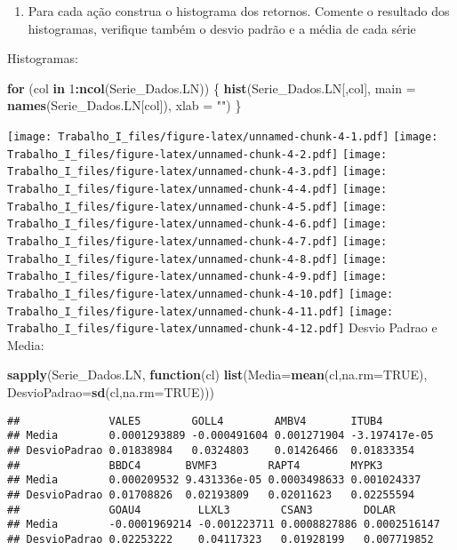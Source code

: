 \documentclass[]{article}
\newenvironment{Shaded}{\begin{snugshade}}{\end{snugshade}}
\newcommand{\KeywordTok}[1]{\textcolor[rgb]{0.13,0.29,0.53}{\textbf{#1}}}
\newcommand{\DataTypeTok}[1]{\textcolor[rgb]{0.13,0.29,0.53}{#1}}
\newcommand{\DecValTok}[1]{\textcolor[rgb]{0.00,0.00,0.81}{#1}}
\newcommand{\StringTok}[1]{\textcolor[rgb]{0.31,0.60,0.02}{#1}}
\newcommand{\OtherTok}[1]{\textcolor[rgb]{0.56,0.35,0.01}{#1}}
\newcommand{\ControlFlowTok}[1]{\textcolor[rgb]{0.13,0.29,0.53}{\textbf{#1}}}
\newcommand{\OperatorTok}[1]{\textcolor[rgb]{0.81,0.36,0.00}{\textbf{#1}}}
\newcommand{\NormalTok}[1]{#1}
\providecommand{\tightlist}{%
  \setlength{\itemsep}{0pt}\setlength{\parskip}{0pt}}
\begin{document}
\begin{enumerate}
\def\labelenumi{\alph{enumi})}
\setcounter{enumi}{1}
\tightlist
\item
  Para cada ação construa o histograma dos retornos. Comente o resultado
  dos histogramas, verifique também o desvio padrão e a média de cada
  série
\end{enumerate}

Histogramas:

\begin{Shaded}
\begin{Highlighting}[]
\ControlFlowTok{for}\NormalTok{ (col }\ControlFlowTok{in} \DecValTok{1}\OperatorTok{:}\KeywordTok{ncol}\NormalTok{(Serie_Dados.LN)) \{}
  \KeywordTok{hist}\NormalTok{(Serie_Dados.LN[,col], }\DataTypeTok{main =} \KeywordTok{names}\NormalTok{(Serie_Dados.LN[col]), }\DataTypeTok{xlab =} \StringTok{""}\NormalTok{)}
\NormalTok{\}}
\end{Highlighting}
\end{Shaded}

\texttt{[image: Trabalho\_I\_files/figure-latex/unnamed-chunk-4-1.pdf]}
\texttt{[image: Trabalho\_I\_files/figure-latex/unnamed-chunk-4-2.pdf]}
\texttt{[image: Trabalho\_I\_files/figure-latex/unnamed-chunk-4-3.pdf]}
\texttt{[image: Trabalho\_I\_files/figure-latex/unnamed-chunk-4-4.pdf]}
\texttt{[image: Trabalho\_I\_files/figure-latex/unnamed-chunk-4-5.pdf]}
\texttt{[image: Trabalho\_I\_files/figure-latex/unnamed-chunk-4-6.pdf]}
\texttt{[image: Trabalho\_I\_files/figure-latex/unnamed-chunk-4-7.pdf]}
\texttt{[image: Trabalho\_I\_files/figure-latex/unnamed-chunk-4-8.pdf]}
\texttt{[image: Trabalho\_I\_files/figure-latex/unnamed-chunk-4-9.pdf]}
\texttt{[image: Trabalho\_I\_files/figure-latex/unnamed-chunk-4-10.pdf]}
\texttt{[image: Trabalho\_I\_files/figure-latex/unnamed-chunk-4-11.pdf]}
\texttt{[image: Trabalho\_I\_files/figure-latex/unnamed-chunk-4-12.pdf]}
Desvio Padrao e Media:

\begin{Shaded}
\begin{Highlighting}[]
\KeywordTok{sapply}\NormalTok{(Serie_Dados.LN, }\ControlFlowTok{function}\NormalTok{(cl) }\KeywordTok{list}\NormalTok{(}\DataTypeTok{Media=}\KeywordTok{mean}\NormalTok{(cl,}\DataTypeTok{na.rm=}\OtherTok{TRUE}\NormalTok{), }\DataTypeTok{DesvioPadrao=}\KeywordTok{sd}\NormalTok{(cl,}\DataTypeTok{na.rm=}\OtherTok{TRUE}\NormalTok{)))}
\end{Highlighting}
\end{Shaded}

\begin{verbatim}
##              VALE5        GOLL4        AMBV4       ITUB4        
## Media        0.0001293889 -0.000491604 0.001271904 -3.197417e-05
## DesvioPadrao 0.01838984   0.0324803    0.01426466  0.01833354   
##              BBDC4       BVMF3        RAPT4        MYPK3      
## Media        0.000209532 9.431336e-05 0.0003498633 0.001024337
## DesvioPadrao 0.01708826  0.02193809   0.02011623   0.02255594 
##              GOAU4         LLXL3        CSAN3        DOLAR       
## Media        -0.0001969214 -0.001223711 0.0008827886 0.0002516147
## DesvioPadrao 0.02253222    0.04117323   0.01928199   0.007719852
\end{verbatim}
\end{document}
